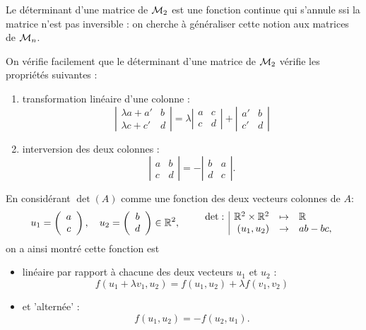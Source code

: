 \bigskip
Le déterminant d'une matrice de $\mathcal{M}_2$ est une fonction continue qui s'annule ssi la matrice n'est pas inversible : on cherche à généraliser cette notion aux matrices de $\mathcal{M}_n$.

\remark
On vérifie facilement que le déterminant d'une matrice de $\mathcal{M}_2$ vérifie les propriétés suivantes : 
\begin{enumerate}
  \item transformation linéaire d'une colonne :
  $$
  \left| \begin{array}{cc} \lambda a + a' & b \\ \lambda c + c' & d \end{array} \right|
  =
  \lambda \left| \begin{array}{cc} a & c \\ c & d \end{array} \right|
  +
  \left| \begin{array}{cc} a' & b \\ c ' & d \end{array} \right|
  $$
  \item interversion des deux colonnes :
  $$
  \left| \begin{array}{cc} a & b \\ c & d \end{array} \right|
  =
  - \left| \begin{array}{cc} b & a \\ d & c \end{array} \right|.
  $$
\end{enumerate}
En considérant $\det(A)$ comme une fonction des deux vecteurs colonnes de $A$:
$$
u_1 = \left(\begin{array}{c}a \\c \end{array} \right), \quad
u_2 = \left(\begin{array}{c}b \\d \end{array} \right) \in \mathbb{R}^2, \qquad
\begin{array}{r|rcl}
  \det : & \mathbb{R}^2 \times \mathbb{R}^2 & \mapsto & \mathbb{R} \\
  & (u_1, u_2) & \rightarrow & ab - bc,
\end{array}
$$
on a ainsi montré cette fonction est 
\begin{itemize}
 \item linéaire par rapport à chacune des deux vecteurs $u_1$ et $u_2$ :
 $$
 f(u_1 + \lambda v_1, u_2) = f(u_1, u_2) + \lambda f(v_1, v_2)
 $$
 \item et 'alternée' :
 $$
 f(u_1, u_2) = -f(u_2, u_1).
 $$
\end{itemize}

